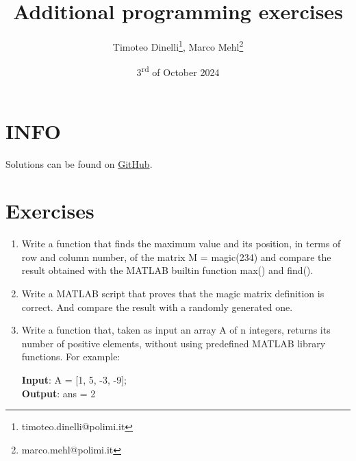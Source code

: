 \documentclass[oneside]{article}
\title{Additional programming exercises}
\author{Timoteo Dinelli\footnote{timoteo.dinelli@polimi.it}, Marco Mehl\footnote{marco.mehl@polimi.it}}
\date{3\textsuperscript{rd} of October 2024}
\begin{document}
\maketitle

\section*{INFO}
Solutions can be found on
\href{https://github.com/Titodinelli/Calcoli-di-Processo-dell-Ingegneria-Chimica}{GitHub}.

\section*{Exercises}

\begin{enumerate}
   \item Write a function that finds the maximum value and its position, in terms of row
      and column number, of the matrix M = magic(234) and compare the result obtained
      with the MATLAB builtin function max() and find().

   \item Write a MATLAB script that proves that the magic matrix definition is correct.
      And compare the result with a randomly generated one.

   \item Write a function that, taken as input an array A of n integers, returns its
      number of positive elements, without using predefined MATLAB library functions. For
      example:
      \begin{tcolorbox}[blanker, breakable, left=5mm, before skip=10pt, after skip=10pt,
         borderline west={1mm}{0pt}{bluepoli}]
         \textbf{Input}: A = [1, 5, -3, -9]; \\
         \textbf{Output}: ans = 2
      \end{tcolorbox}


\end{enumerate}
\end{document}

